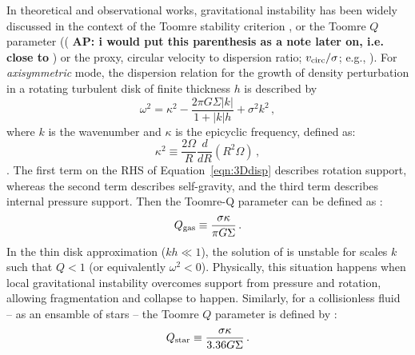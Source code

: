 \IfFileExists{emulateapjlegacy.cls}{\documentclass[iop]{emulateapjlegacy}}{\documentclass[iop]{emulateapj}}
\newcommand{\AP}[1]{({\bf \color{apcolor} AP: #1})}
\begin{document}
In theoretical and observational works, gravitational instability has been widely discussed in the context of the Toomre stability criterion \citep{Toomre64a, Goldreich65b}, or the Toomre $Q$ parameter (\AP{i would put this parenthesis as a note later on, i.e. close to \Eq{q_eff}} or the proxy, circular velocity to dispersion ratio; $v_{\rm circ}/\sigma$; e.g., \citealt{GarciaBurillo03a, Genzel11a, Kassin12a, Leung19a}).
%
For {\it axisymmetric} mode, the dispersion relation for the growth of density perturbation in a rotating turbulent disk of 
finite thickness $h$ is described by 
\begin{equation}
\omega^2 = \kappa^2 - \frac{2\pi G \Sigma |k|}{1 + |k| h} + \sigma^2 k^2\,,
\label{eqn:3Ddisp}
\end{equation}
where $k$ is the wavenumber and $\kappa$ is the epicyclic frequency, defined as:
\begin{equation}
\kappa^2\equiv\frac{2\Omega}{R}\frac{d}{dR}\left(R^2\Omega\right)\,,
\label{eqn:kappa}
\end{equation}
\citep{Romeo92a}.
The first term on the RHS of Equation~\ref{eqn:3Ddisp} describes rotation support, whereas the second term describes self-gravity, and the third term describes internal pressure support. Then the Toomre-Q parameter can be defined as \citep{Toomre64a}:
\begin{equation}
Q_{\rm gas}\equiv\frac{\sigma\kappa}{\pi G \Sigma}\,.
\label{eqn:Q}
\end{equation}
In the thin disk approximation ($kh\ll1$), the solution of  is unstable for scales $k$ such that $Q < 1$ (or equivalently $\omega^2 < 0$). Physically, this situation happens when local gravitational instability 
overcomes support from pressure and rotation, allowing fragmentation and collapse to happen.
Similarly, for a collisionless fluid -- as an ensamble of stars -- the Toomre $Q$ parameter is defined by \citep{Toomre64a}:
\begin{equation}
Q_{\rm star} \equiv\frac{\sigma\kappa}{3.36 G \Sigma}\,.
\end{equation}
\end{document}
